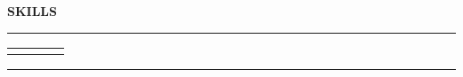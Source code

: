\vspace{\sectionTitleSpacing}

\begin{center}
\textbf{SKILLS}
\end{center}

\vspace{\sectionTitleSpacing}

\rule{\textwidth}{}

\begin{center}
\begin{tabular}{p{}p{}p{}p{}}
 &  &  & 
\end{tabular}
\end{center}

\vspace{\sectionSeparatorSpacing}
\rule{\textwidth}{}
\vspace{\sectionSeparatorSpacing} 